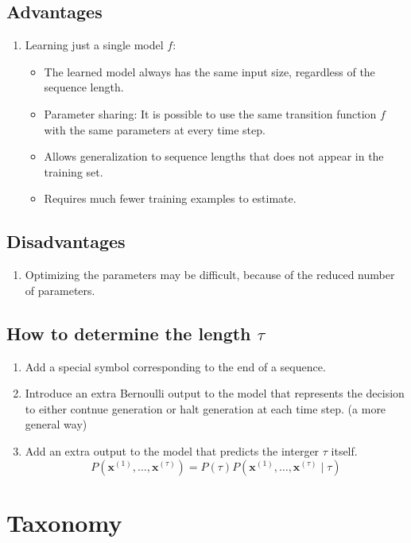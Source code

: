 \documentclass[12pt, a4paper]{article}
\newcommand{\egvx}[1]{\boldsymbol{x}^{(#1)}}
\begin{document}
\subsection{Advantages}
\begin{enumerate}
    \item Learning just a single model $f$:
        \begin{itemize}
            \item The learned model always has the same input size, regardless of the sequence length.
            \item Parameter sharing: It is possible to use the same transition function $f$ with the same parameters at every time step.
            \item Allows generalization to sequence lengths that does not appear in the training set.
            \item Requires much fewer training examples to estimate.
        \end{itemize}
\end{enumerate}


\subsection{Disadvantages}
\begin{enumerate}
    \item Optimizing the parameters may be difficult, because of the reduced number of parameters.
\end{enumerate}


\subsection{How to determine the length $\tau$}
\begin{enumerate}
    \item Add a special symbol corresponding to the end of a sequence.
    \item Introduce an extra Bernoulli output to the model that represents the decision to either contnue generation or halt generation at each time step. (a more general way)
    \item Add an extra output to the model that predicts the interger $\tau$ itself.
        \[
            P(\egvx{1},\dots,\egvx{\tau}) = P(\tau) P(\egvx{1},\dots,\egvx{\tau} \mid \tau)
        \]
\end{enumerate}


\section{Taxonomy}
\end{document}
